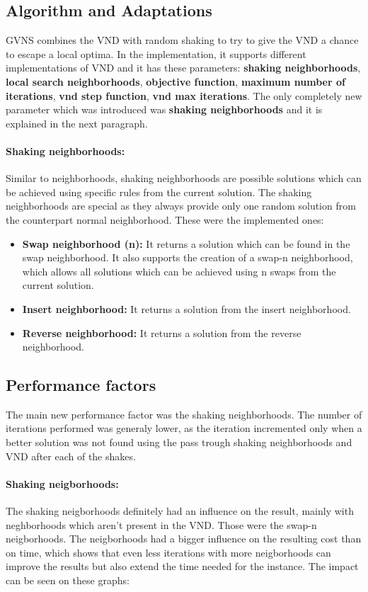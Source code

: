\documentclass{article}
\begin{document}
\subsection*{Algorithm and Adaptations}
GVNS combines the VND with random shaking to try to give the VND a chance to escape a local optima. In the implementation, it supports different implementations of VND and it has these parameters:  \textbf{shaking neighborhoods},  \textbf{local search neighborhoods},  \textbf{objective function},  \textbf{maximum number of iterations},  \textbf{vnd step function},  \textbf{vnd max iterations}. The only completely new parameter which was introduced was \textbf{shaking neighborhoods} and it is explained in the next paragraph.

\paragraph{Shaking neighborhoods:}
Similar to neighborhoods, shaking neighborhoods are possible solutions which can be achieved using specific rules from the current solution. The shaking neighborhoods are special as they always provide only one random solution from the counterpart normal neighborhood. These were the implemented ones:
\begin{itemize}
	\item \textbf{Swap neighborhood (n):} It returns a solution which can be found in the swap neighborhood. It also supports the creation of a swap-n neighborhood, which allows all solutions which can be achieved using n swaps from the current solution.
	\item \textbf{Insert neighborhood:} It returns a solution from the insert neighborhood.
	\item \textbf{Reverse neighborhood:} It returns a solution from the reverse neighborhood.
\end{itemize}

\subsection*{Performance factors}
The main new performance factor was the shaking neighborhoods. The number of iterations performed was generaly lower, as the iteration incremented only when a better solution was not found using the pass trough shaking neighborhoods and VND after each of the shakes. 

\paragraph{Shaking neigborhoods:}
The shaking neigborhoods definitely had an influence on the result, mainly with neghborhoods which aren't present in the VND. Those were the swap-n neigborhoods. The neigborhoods had a bigger influence on the resulting cost than on time, which shows that even less iterations with more neigborhoods can improve the results but also extend the time needed for the instance. The impact can be seen on these graphs:
\end{document}
